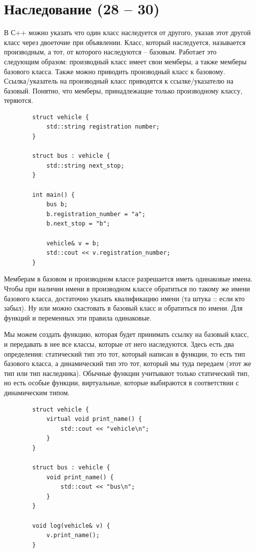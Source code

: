 \documentclass[12pt, a4paper]{article}
\begin{document}
	\section{Наследование (28 -- 30)}
	В С++ можно указать что один класс наследуется от другого, указав этот другой класс через двоеточие при объявлении. Класс, который наследуется, называется производным, а тот, от которого наследуются -- базовым. Работает это следующим образом: производный класс имеет свои мемберы, а также мемберы базового класса. Также можно приводить производный класс к базовому. Ссылка/указатель на производный класс приводятся к ссылке/указателю на базовый. Понятно, что мемберы, принадлежащие только производному классу, теряются.
	\begin{verbatim}
		struct vehicle {
			std::string registration number;
		}
		
		struct bus : vehicle {
			std::string next_stop;
		}
		
		int main() {
			bus b;
			b.registration_number = "a";
			b.next_stop = "b";
			
			vehicle& v = b;
			std::cout << v.registration_number;
		}
	\end{verbatim}
	\par Мемберам в базовом и производном классе разрешается иметь одинаковые имена. Чтобы при наличии имени в производном классе обратиться по такому же имени базового класса, достаточно указать квалификацию имени (та штука :: если кто забыл). Ну или можно скастовать в базовый класс и обратиться по имени. Для функций и переменных эти правила одинаковые.
	\\\par Мы можем создать функцию, которая будет принимать ссылку на базовый класс, и передавать в нее все классы, которые от него наследуются. Здесь есть два определения: статический тип это тот, который написан в функции, то есть тип базового класса, а динамический тип это тот, который мы туда передаем (этот же тип или тип наследника). Обычные функции учитывают только статический тип, но есть особые функции, виртуальные, которые выбираются в соответствии с динамическим типом.
	\begin{verbatim}
		struct vehicle {
			virtual void print_name() {
				std::cout << "vehicle\n";
			}
		}
		
		struct bus : vehicle {
			void print_name() {
				std::cout << "bus\n";
			}
		}
		
		void log(vehicle& v) {
			v.print_name();
		}
	\end{verbatim}
\end{document}
